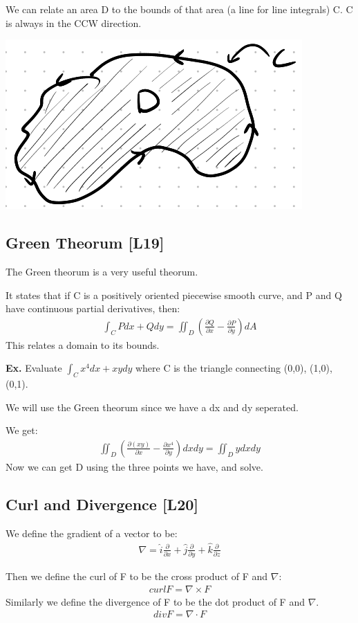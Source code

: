 \documentclass[12pt,letterpaper]{article} \usepackage{amsmath} \usepackage{graphicx} \usepackage[margin=1in]{geometry} \usepackage{longtable}  \usepackage{amssymb}
\begin{document}
	We can relate an area D to the bounds of that area (a line for line integrals) C. C is always in the CCW direction. 
	\begin{center}
		\includegraphics[width=0.3\linewidth]{curve}
	\end{center}
	
	\subsection{Green Theorum [L19]}
	The Green theorum is a very useful theorum. 
	
	It states that if C is a positively oriented piecewise smooth curve, and P and Q have continuous partial derivatives, then:
	\begin{align*}
		\int_C Pdx + Qdy = \iint_D \left(\frac{\partial Q}{\partial x} - \frac{\partial P}{\partial y}\right)dA
	\end{align*}
	This relates a domain to its bounds.

	\begin{mdframed}[]
	\textbf{Ex. } Evaluate $\int_C x^4 dx + xy dy$ where C is the triangle connecting (0,0), (1,0), (0,1).
	
	We will use the Green theorum since we have a dx and dy seperated. 
	
	We get:
	\begin{align*}
		\iint_D \left(\frac{\partial (xy)}{\partial x} - \frac{\partial x^4}{\partial y}\right) dxdy = \iint_D y dxdy
	\end{align*}
	Now we can get D using the three points we have, and solve. 
	\end{mdframed}
	
	\subsection{Curl and Divergence [L20]}
	We define the gradient of a vector to be:
	\begin{align*}
		\nabla = \hat{i} \frac{\partial }{\partial x} + \hat{j} \frac{\partial }{\partial y} + \hat{k} \frac{\partial }{\partial z}
	\end{align*}

	Then we define the curl of F to be the cross product of F and $\nabla$:
	\begin{align*}
		curl F = \nabla \times F
	\end{align*}
	Similarly we define the divergence of F to be the dot product of F and $\nabla$.
	\begin{align*}
		div F = \nabla \cdot F
	\end{align*}
\end{document}

